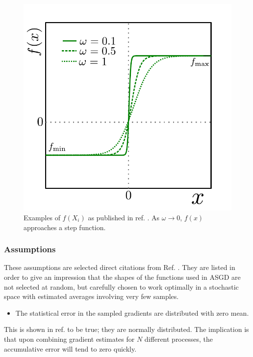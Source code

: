 \begin{figure}
 \begin{center}
  \includegraphics[scale=0.75]{../Graphics/ASGD_f.pdf}
  \caption{Examples of $f(X_i)$ as published in ref. \cite{ASGD}. As $\omega\to0$, $f(x)$ approaches a step function.}
  \label{fig:f_ASGD}
 \end{center}
\end{figure}

\subsubsection{Assumptions}

These assumptions are selected direct citations from Ref. \cite{ASGD}. They are listed in order to give an impression that the shapes of the functions used in ASGD are not selected at random, but carefully chosen to work optimally in a stochastic space with estimated averages involving very few samples.

\begin{itemize}
 \item The statistical error in the sampled gradients are distributed with zero mean.
\end{itemize}

This is shown in ref. to be true; they are normally distributed. The implication is that upon combining gradient estimates for $N$ different processes, the accumulative error will tend to zero quickly.

